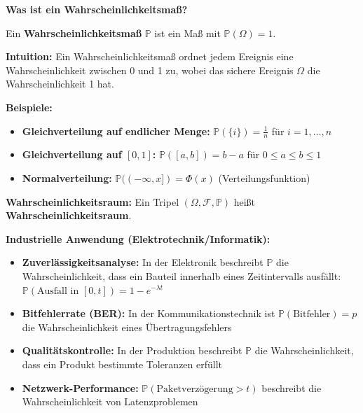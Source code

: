 \begin{denoobification}[Wahrscheinlichkeitsmaß]
\textbf{Was ist ein Wahrscheinlichkeitsmaß?}

Ein \textbf{Wahrscheinlichkeitsmaß} $\mathbb{P}$ ist ein Maß mit $\mathbb{P}(\Omega) = 1$.

\textbf{Intuition:} Ein Wahrscheinlichkeitsmaß ordnet jedem Ereignis eine Wahrscheinlichkeit zwischen 0 und 1 zu, wobei das sichere Ereignis $\Omega$ die Wahrscheinlichkeit 1 hat.

\textbf{Beispiele:}
\begin{itemize}
    \item \textbf{Gleichverteilung auf endlicher Menge:} $\mathbb{P}(\{i\}) = \frac{1}{n}$ für $i = 1, \ldots, n$
    \item \textbf{Gleichverteilung auf $[0,1]$:} $\mathbb{P}([a,b]) = b-a$ für $0 \leq a \leq b \leq 1$
    \item \textbf{Normalverteilung:} $\mathbb{P}((-\infty, x]) = \Phi(x)$ (Verteilungsfunktion)
\end{itemize}

\textbf{Wahrscheinlichkeitsraum:} Ein Tripel $(\Omega, \mathcal{F}, \mathbb{P})$ heißt \textbf{Wahrscheinlichkeitsraum}.

\textbf{Industrielle Anwendung (Elektrotechnik/Informatik):}
\begin{itemize}
    \item \textbf{Zuverlässigkeitsanalyse:} In der Elektronik beschreibt $\mathbb{P}$ die Wahrscheinlichkeit, dass ein Bauteil innerhalb eines Zeitintervalls ausfällt: $\mathbb{P}(\text{Ausfall in } [0,t]) = 1 - e^{-\lambda t}$
    \item \textbf{Bitfehlerrate (BER):} In der Kommunikationstechnik ist $\mathbb{P}(\text{Bitfehler}) = p$ die Wahrscheinlichkeit eines Übertragungsfehlers
    \item \textbf{Qualitätskontrolle:} In der Produktion beschreibt $\mathbb{P}$ die Wahrscheinlichkeit, dass ein Produkt bestimmte Toleranzen erfüllt
    \item \textbf{Netzwerk-Performance:} $\mathbb{P}(\text{Paketverzögerung} > t)$ beschreibt die Wahrscheinlichkeit von Latenzproblemen
\end{itemize}


\end{denoobification}
